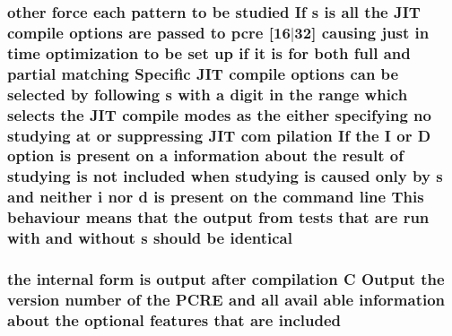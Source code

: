 \subsubsection[{\texorpdfstring{identical}{identical}}]{ other force each {\bf pattern} {\bf to} {\bf be} {\bf studied} If {\bf s} {\bf is} {\bf all} the J\+IT {\bf compile} {\bf options} {\bf are} passed {\bf to} {\bf pcre} \mbox{[}16$\vert$32\mbox{]} causing just {\bf in} {\bf time} optimization {\bf to} {\bf be} {\bf set} up {\bf if} {\bf it} {\bf is} for both full and {\bf partial} {\bf matching} Specific J\+IT {\bf compile} {\bf options} {\bf can} {\bf be} {\bf selected} by following {\bf s} {\bf with} {\bf a} digit {\bf in} the range {\bf which} selects the J\+IT {\bf compile} {\bf modes} {\bf as} the either {\bf specifying} no {\bf studying} at {\bf or} suppressing J\+IT com pilation If the {\bf I} {\bf or} {\bf D} {\bf option} {\bf is} {\bf present} {\bf on} {\bf a} information about the {\bf result} {\bf of} {\bf studying} {\bf is} {\bf not} {\bf included} when {\bf studying} {\bf is} caused only by {\bf s} and neither {\bf i} nor {\bf d} {\bf is} {\bf present} {\bf on} the {\bf command} {\bf line} This behaviour means that the {\bf output} {\bf from} {\bf tests} that {\bf are} {\bf run} {\bf with} and without {\bf s} should {\bf be} identical}\hypertarget{pcretest_8txt_af0a50b1d1275934199413971365e553f}{}\label{pcretest_8txt_af0a50b1d1275934199413971365e553f}
\subsubsection[{\texorpdfstring{included}{included}}]{\setlength{\rightskip}{0pt plus 5cm}the internal form {\bf is} {\bf output} {\bf after} {\bf compilation} {\bf C} Output the version {\bf number} {\bf of} the {\bf P\+C\+RE} and {\bf all} avail {\bf able} information about the {\bf optional} {\bf features} that {\bf are} included}\hypertarget{pcretest_8txt_ac860e42757fb208f73f707b4078e68b5}{}\label{pcretest_8txt_ac860e42757fb208f73f707b4078e68b5}
